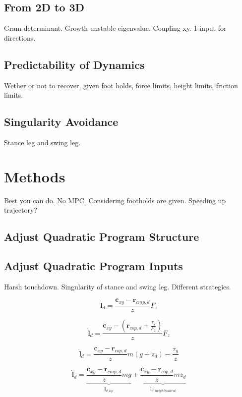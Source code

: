 \subsection{From 2D to 3D}
Gram determinant. Growth unstable eigenvalue. Coupling xy. 1 input for directions.
\subsection{Predictability of Dynamics}
Wether or not to recover, given foot holds, force limits, height limits, friction limits.
\subsection{Singularity Avoidance}
Stance leg and swing leg. 
\section{Methods}
Best you can do. No MPC. Considering footholds are given. Speeding up trajectory?
\subsection{Adjust Quadratic Program Structure}
\subsection{Adjust Quadratic Program Inputs}
Harsh touchdown. Singularity of stance and swing leg. Different strategies. 

\begin{equation}
\dot{\mathbf{l}}_d=\frac{\mathbf{c}_{xy}-\mathbf{r}_{cmp,d}}{z}F_z
\end{equation}

\begin{equation}
\dot{\mathbf{l}}_d=\frac{\mathbf{c}_{xy}-(\mathbf{r}_{cop,d}+\frac{\tau_y}{F_z})}{z}F_z
\end{equation}

\begin{equation}
\dot{\mathbf{l}}_d=\frac{\mathbf{c}_{xy}-\mathbf{r}_{cop,d}}{z}m(g+\ddot{z}_d) - \frac{\tau_y}{z}
\end{equation}
 
 \begin{equation}
\dot{\mathbf{l}}_d=\underbrace{ \frac{\mathbf{c}_{xy}-\mathbf{r}_{cmp,d}} {z}mg}_{\dot{\mathbf{l}}_{d,lip}}  + \underbrace{\frac{\mathbf{c}_{xy}-\mathbf{r}_{cop,d}}{z}m\ddot{z}_d}_{\dot{\mathbf{l}}_{d,heightcontrol}}
\end{equation}

